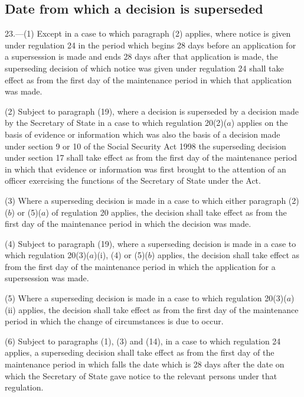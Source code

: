 \documentclass[a4paper,12pt]{article}
\begin{document}
\subsection[23. Date from which a decision is superseded]{Date from which a decision is superseded}

23.—(1) Except in a case to which paragraph (2) applies, where notice is given under regulation 24 in the period which begins 28 days before an application for a supersession is made and ends 28 days after that application is made, the superseding decision of which notice was given under regulation 24 shall take effect as from the first day of the maintenance period in which that application was made.

(2) 
Subject to paragraph (19), where a decision is superseded  %
by a decision made by the Secretary of State in a case to which regulation 20(2)($a$) applies on the basis of evidence or information which was also the basis of a decision made under section 9 or 10 of the Social Security Act 1998 the superseding decision under section 17 shall take effect as from the first day of the maintenance period in which that evidence or information was first brought to the attention of an officer exercising the functions of the Secretary of State under the Act.

(3) Where a superseding decision is made in a case to which either paragraph (2)($b$) or (5)($a$) of regulation 20 applies, the decision shall take effect as from the first day of the maintenance period in which the decision was made.

(4) 
Subject to paragraph (19), where a superseding decision is made  %
in a case to which regulation 20(3)($a$)(i), (4) or (5)($b$) applies, the decision shall take effect as from the first day of the maintenance period in which the application for a supersession was made.

(5) Where a superseding decision is made in a case to which regulation 20(3)($a$)(ii) applies, the decision shall take effect as from the first day of the maintenance period in which the change of circumstances is due to occur.

(6) Subject to paragraphs (1), (3) and (14), in a case to which regulation 24 applies, a superseding decision shall take effect as from the first day of the maintenance period in which falls the date which is 28 days after the date on which the Secretary of State gave notice to the relevant persons under that regulation.
\end{document}
